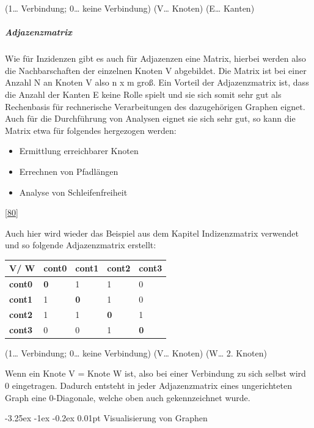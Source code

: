 \documentclass[
    headings=optiontotocandhead,%
    twoside,
    numbers=noenddot,%
    12pt, %
    titlepage, %
    parskip=full, %
    listof=leveldown, 
    numbers=noenddot, %
    a4paper,DIV=14,
    BCOR=15mm,
]{scrbook}
\makeatletter
\providecommand{\tightlist}{%
  \setlength{\itemsep}{0pt}\setlength{\parskip}{0pt}}
\renewcommand\paragraph{\@startsection{paragraph}{4}{\z@}%
    {-3.25ex \@plus -1ex \@minus -0.2ex}%
    {0.01pt}%
    {\raggedsection\normalfont\sectfont\nobreak\size@paragraph}%
  }
\makeatother
\begin{document}
(1\ldots{} Verbindung; 0\ldots{} keine Verbindung) (V\ldots{} Knoten)
(E\ldots{} Kanten)

\hypertarget{adjazenzmatrix}{%
\subparagraph{Adjazenzmatrix}\label{adjazenzmatrix}}

Wie für Inzidenzen gibt es auch für Adjazenzen eine Matrix, hierbei
werden also die Nachbarschaften der einzelnen Knoten V abgebildet. Die
Matrix ist bei einer Anzahl N an Knoten V also n x m groß. Ein Vorteil
der Adjazenzmatrix ist, dass die Anzahl der Kanten E keine Rolle spielt
und sie sich somit sehr gut als Rechenbasis für rechnerische
Verarbeitungen des dazugehörigen Graphen eignet. Auch für die
Durchführung von Analysen eignet sie sich sehr gut, so kann die Matrix
etwa für folgendes hergezogen werden:

\begin{itemize}
\tightlist
\item
  Ermittlung erreichbarer Knoten
\item
  Errechnen von Pfadlängen
\item
  Analyse von Schleifenfreiheit
\end{itemize}

{[}\protect\hyperlink{ref-BigDataInsider}{80}{]}

Auch hier wird wieder das Beispiel aus dem Kapitel Indizenzmatrix
verwendet und so folgende Adjazenzmatrix erstellt:

\begin{longtable}[]{@{}lllll@{}}
\toprule
V/ W & cont0 & cont1 & cont2 & cont3\tabularnewline
\midrule
\endhead
\textbf{cont0} & \textbf{0} & 1 & 1 & 0\tabularnewline
\textbf{cont1} & 1 & \textbf{0} & 1 & 0\tabularnewline
\textbf{cont2} & 1 & 1 & \textbf{0} & 1\tabularnewline
\textbf{cont3} & 0 & 0 & 1 & \textbf{0}\tabularnewline
\bottomrule
\end{longtable}

(1\ldots{} Verbindung; 0\ldots{} keine Verbindung) (V\ldots{} Knoten)
(W\ldots{} 2. Knoten)

Wenn ein Knote V = Knote W ist, also bei einer Verbindung zu sich selbst
wird 0 eingetragen. Dadurch entsteht in jeder Adjazenzmatrix eines
ungerichteten Graph eine 0-Diagonale, welche oben auch gekennzeichnet
wurde.

\hypertarget{visualisierung-von-graphen}{%
\paragraph{Visualisierung von
Graphen}\label{visualisierung-von-graphen}}
\end{document}
